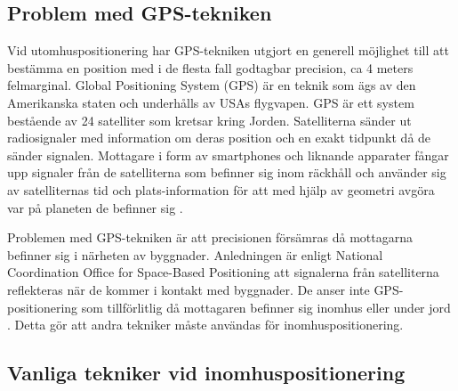 \documentclass[swedish, a4paper,12pt]{article}
\begin{document}
\subsection{Problem med GPS-tekniken}
Vid utomhuspositionering har GPS-tekniken utgjort en generell möjlighet till att bestämma en position med i de flesta fall godtagbar precision, ca 4 meters felmarginal\cite{GPS_US_ACCURACY}.
Global Positioning System (GPS) är en teknik som ägs av den Amerikanska staten och underhålls av USAs flygvapen. GPS är ett system bestående av 24 satelliter som kretsar kring Jorden. Satelliterna sänder ut radiosignaler med information
om deras position och en exakt tidpunkt då de sänder signalen. Mottagare i form av smartphones och liknande apparater fångar upp signaler från de satelliterna som befinner sig inom räckhåll och använder sig av satelliternas tid och plats-information för att med hjälp av geometri avgöra var på planeten de befinner sig \cite{GPS_US_HOW}.

Problemen med GPS-tekniken är att precisionen försämras då mottagarna befinner sig i närheten av byggnader. Anledningen är enligt National Coordination Office for Space-Based Positioning att signalerna från satelliterna reflekteras när de kommer i kontakt med byggnader. De anser inte GPS-positionering som tillförlitlig då mottagaren befinner sig inomhus eller under jord \cite{GPS_US_ACCURACY}. Detta gör att andra tekniker måste användas för inomhuspositionering.

\subsection{Vanliga tekniker vid inomhuspositionering}
\end{document}
